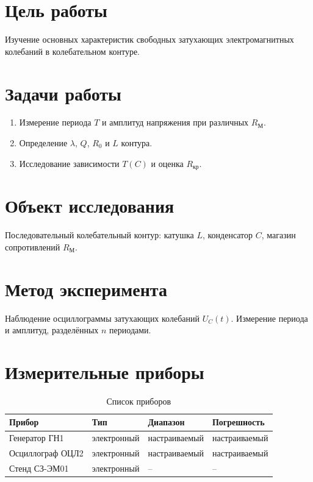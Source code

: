 \section{Цель работы}

Изучение основных характеристик свободных затухающих электромагнитных колебаний в колебательном контуре.

\section{Задачи работы}

\begin{enumerate}
    \item Измерение периода $T$ и амплитуд напряжения при различных $R_\text{М}$.
    \item Определение $\lambda$, $Q$, $R_0$ и $L$ контура.
    \item Исследование зависимости $T(C)$ и оценка $R_\text{кр}$.
\end{enumerate}

\section{Объект исследования}

Последовательный колебательный контур: катушка $L$, конденсатор $C$, магазин сопротивлений $R_\text{М}$.

\section{Метод эксперимента}

Наблюдение осциллограммы затухающих колебаний $U_C(t)$. Измерение периода и амплитуд, разделённых $n$ периодами.

\section{Измерительные приборы}

\begin{table}[h]
\centering
\caption{Список приборов}
\begin{tabular}{|l|l|p{5cm}|p{4cm}|}
\hline
\textbf{Прибор} & \textbf{Тип} & \textbf{Диапазон} & \textbf{Погрешность} \\
\hline
Генератор ГН1 & электронный & настраиваемый & настраиваемый \\
\hline
Осциллограф ОЦЛ2 & электронный & настраиваемый & настраиваемый \\
\hline
Стенд СЗ-ЭМ01 & электронный & -- & -- \\
\hline
\end{tabular}
\end{table}


